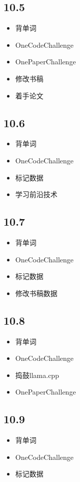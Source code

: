 \documentclass[UTF8]{ctexart}
\begin{document}
\subsection*{10.5}
\begin{itemize}
    \item 背单词
    \item OneCodeChallenge
    \item OnePaperChallenge
    \item 修改书稿
    \item 着手论文
\end{itemize}

\subsection*{10.6}
\begin{itemize}
    \item 背单词
    \item OneCodeChallenge
    \item 标记数据
    \item 学习前沿技术
\end{itemize}

\subsection*{10.7}
\begin{itemize}
    \item 背单词
    \item OneCodeChallenge
    \item 标记数据
    \item 修改书稿数据
\end{itemize}

\subsection*{10.8}
\begin{itemize}
    \item 背单词
    \item OneCodeChallenge
    \item 捣鼓llama.cpp
    \item OnePaperChallenge
\end{itemize}

\subsection*{10.9}
\begin{itemize}
    \item 背单词
    \item OneCodeChallenge
    \item 标记数据
\end{itemize}
\end{document}
